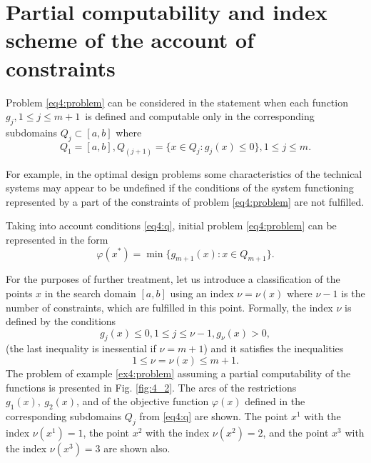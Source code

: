 \section{Partial computability and index scheme of the account of constraints}
Problem \eqref{eq4:problem} can be considered in the statement when each function $g_j,1\le j\le m+1$ is defined and computable only in the corresponding subdomains $Q_j\subset [a,b]$ where
\begin{equation}
  \label{eq4:q}
  Q_1=[a,b],Q_(j+1)=\{x\in Q_j:g_j(x)\le 0\},1\le j\le m.
\end{equation}

For example, in the optimal design problems some characteristics of the technical systems may appear to be undefined if the conditions of the system functioning represented by a part of the constraints of problem \eqref{eq4:problem} are not fulfilled.

Taking into account conditions \eqref{eq4:q}, initial problem \eqref{eq4:problem} can be represented in the form
\begin{equation}
  \varphi(x^*)=\min\{g_{m+1}(x):x\in Q_{m+1}\}.
\end{equation}

For the purposes of further treatment, let us introduce a classification of the points $x$ in the search domain $[a,b]$ using an index $\nu=\nu(x)$ where $\nu-1$ is the number of constraints, which are fulfilled in this point. Formally, the index $\nu$ is defined by the conditions
\begin{equation}
  g_j(x)\le 0,1\le j \le \nu-1,g_\nu(x)>0,
\end{equation}
(the last inequality is inessential  if $\nu=m+1$) and it satisfies the inequalities
\begin{displaymath}
  1\le\nu=\nu(x)\le m+1.
\end{displaymath}
The problem of example \ref{ex4:problem} assuming a partial computability of the functions is presented in Fig. \ref{fig:4_2}. The arcs of the restrictions $g_1(x),\:g_2(x)$, and of the objective function $\varphi(x)$ defined in the corresponding subdomains $Q_j$ from \eqref{eq4:q} are shown. The point $x^1$ with the index $\nu(x^1)=1$, the point $x^2$ with the index $\nu(x^2)=2$, and the point $x^3$ with the index $\nu(x^3)=3$ are shown also.

